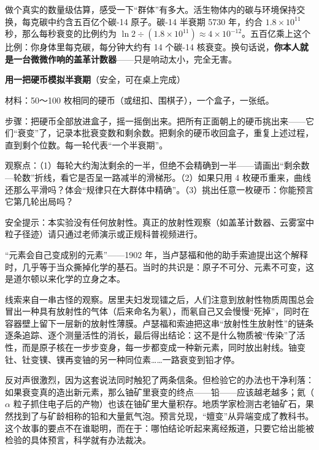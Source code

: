做个真实的数量级估算，感受一下“群体”有多大。活生物体内的碳与环境保持交换，每克碳中约含五百亿个碳-14 原子。碳-14 半衰期 5730 年，约合 $1.8\times 10^{11}$ 秒，那么每秒衰变的比例约为 $\ln 2 \div (1.8\times 10^{11}) \approx 4\times 10^{-12}$。五百亿乘上这个比例：你身体里每克碳，每分钟大约有 14 个碳-14 核衰变。换句话说，\textbf{你本人就是一台微微作响的盖革计数器}——只是响动太小，完全无害。

\begin{shiyan}
\textbf{用一把硬币模拟半衰期}（安全，可在桌上完成）

材料：50～100 枚相同的硬币（或纽扣、围棋子），一个盒子，一张纸。

步骤：把硬币全部放进盒子，摇一摇倒出来。把所有正面朝上的硬币挑出来——它们“衰变”了，记录本批衰变数和剩余数。把剩余的硬币收回盒子，重复上述过程，直到剩个位数。每一轮代表“一个半衰期”。

观察点：（1）每轮大约淘汰剩余的一半，但绝不会精确到一半——请画出“剩余数—轮数”折线，看它是否呈一路减半的滑梯形。（2）如果只用 4 枚硬币重来，曲线还那么平滑吗？体会“规律只在大群体中精确”。（3）挑出任意一枚硬币：你能预言它第几轮出局吗？

安全提示：本实验没有任何放射性。真正的放射性观察（如盖革计数器、云雾室中粒子径迹）请只通过老师演示或正规科普视频进行。
\end{shiyan}

\begin{zhengju}
“元素会自己变成别的元素”——1902 年，当卢瑟福和他的助手索迪提出这个解释时，几乎等于当众撕掉化学的基石。当时的共识是：原子不可分、元素不可变，这是道尔顿以来化学的立身之本。

线索来自一串古怪的观察。居里夫妇发现镭之后，人们注意到放射性物质周围总会冒出一种具有放射性的气体（后来命名为氡），而氡自己又会慢慢“死掉”，同时在容器壁上留下一层新的放射性薄膜。卢瑟福和索迪把这串“放射性生放射性”的链条逐条追踪、逐个测量活性的消长，最后得出结论：这不是什么物质被“传染”了活性，而是原子核在一步步变身，每一步都变成一种新元素，同时放出射线。铀变钍、钍变镤、镤再变铀的另一种同位素……一路衰变到铅才停。

反对声很激烈，因为这套说法同时触犯了两条信条。但检验它的办法也干净利落：如果衰变真的造出新元素，那么铀矿里衰变的终点——铅——应该越老越多；氦（$\alpha$ 粒子抓住电子后的产物）也该在铀矿里大量积存。地质学家检测古老铀矿石，果然找到了与矿龄相称的铅和大量氦气泡。预言兑现，“嬗变”从异端变成了教科书。这个故事的要点不在谁聪明，而在于：哪怕结论听起来离经叛道，只要它给出能被检验的具体预言，科学就有办法裁决。
\end{zhengju}

